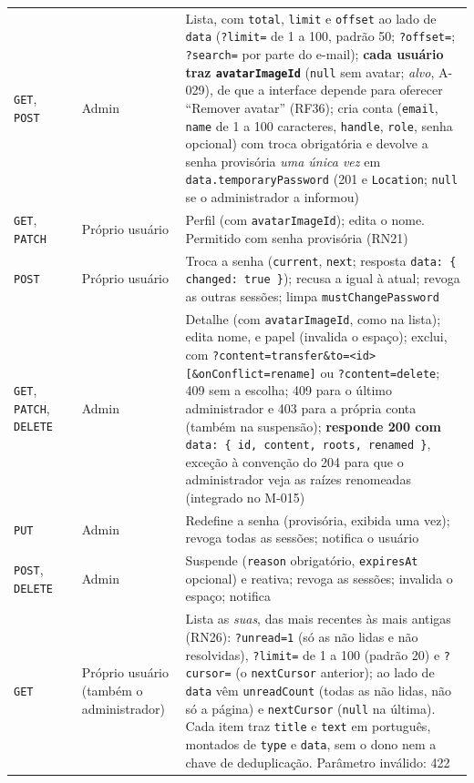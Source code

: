 \begin{longtable}{@{}L{1.5cm}L{4.1cm}L{2.1cm}L{6.1cm}@{}}
\texttt{GET}, \texttt{POST} &  & Admin & Lista, com \texttt{total}, \texttt{limit} e \texttt{offset} ao lado de \texttt{data} (\texttt{?limit=} de 1 a 100, padrão 50; \texttt{?offset=}; \texttt{?search=} por parte do e-mail); \textbf{cada usuário traz \texttt{avatarImageId}} (\texttt{null} sem avatar; \emph{alvo}, A-029), de que a interface depende para oferecer ``Remover avatar'' (RF36); cria conta (\texttt{email}, \texttt{name} de 1 a 100 caracteres, \texttt{handle}, \texttt{role}, senha opcional) com troca obrigatória e devolve a senha provisória \emph{uma única vez} em \texttt{data.temporaryPassword} (201 e \texttt{Location}; \texttt{null} se o administrador a informou)\\[1pt]
\texttt{GET}, \texttt{PATCH} &  & Próprio usuário & Perfil (com \texttt{avatarImageId}); edita o nome. Permitido com senha provisória (RN21)\\[1pt]
\texttt{POST} &  & Próprio usuário & Troca a senha (\texttt{current}, \texttt{next}; resposta \texttt{data: \{ changed: true \}}); recusa a igual à atual; revoga as outras sessões; limpa \texttt{mustChangePassword}\\[1pt]
\texttt{GET}, \texttt{PATCH}, \texttt{DELETE} &  & Admin & Detalhe (com \texttt{avatarImageId}, como na lista); edita nome,  e papel (invalida o espaço); exclui, com \texttt{?content=transfer\&to=<id>[\&onConflict=rename]} ou \texttt{?content=delete}; 409  sem a escolha; 409  para o último administrador e 403  para a própria conta (também na suspensão); \textbf{responde 200 com} \texttt{data: \{ id, content, roots, renamed \}}, exceção à convenção do 204 para que o administrador veja as raízes renomeadas (integrado no M-015)\\[1pt]
\texttt{PUT} &  & Admin & Redefine a senha (provisória, exibida uma vez); revoga todas as sessões; notifica o usuário\\[1pt]
\texttt{POST}, \texttt{DELETE} &  & Admin & Suspende (\texttt{reason} obrigatório, \texttt{expiresAt} opcional) e reativa; revoga as sessões; invalida o espaço; notifica\\[1pt]
\texttt{GET} &  & Próprio usuário (também o administrador) & Lista as \emph{suas}, das mais recentes às mais antigas (RN26): \texttt{?unread=1} (só as não lidas e não resolvidas), \texttt{?limit=} de 1 a 100 (padrão 20) e \texttt{?cursor=} (o \texttt{nextCursor} anterior); ao lado de \texttt{data} vêm \texttt{unreadCount} (todas as não lidas, não só a página) e \texttt{nextCursor} (\texttt{null} na última). Cada item traz \texttt{title} e \texttt{text} em português, montados de \texttt{type} e \texttt{data}, sem o dono nem a chave de deduplicação. Parâmetro inválido: 422\\[1pt]

\end{longtable}
